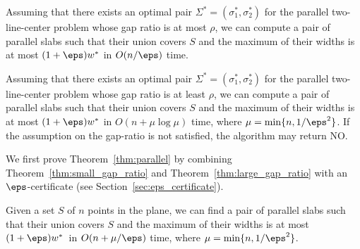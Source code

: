 \begin{theorem}
    \label{thm:small_gap_ratio}
    Assuming that there exists an optimal pair $\Sigma^* = (\sigma_1^*, \sigma_2^*)$ for the parallel two-line-center problem whose gap ratio is at most $\rho$, 
    we can compute a pair of parallel slabs such that their union covers $S$ and the maximum of their widths is at most $(1+\eps)w^*$ in $O(n/\eps)$ time. 
\end{theorem}

\begin{theorem}
    \label{thm:large_gap_ratio}
    Assuming that there exists an optimal pair $\Sigma^* = (\sigma_1^*, \sigma_2^*)$ for the parallel two-line-center problem whose gap ratio is at least $\rho$, 
    we can compute a pair of parallel slabs such that their union covers $S$ and the maximum of their widths is at most $(1+\eps)w^*$ in $O(n+ \mu\log \mu)$ time, where $\mu = \min \{n, 1/\eps^2\}$. 
    If the assumption on the gap-ratio is not satisfied, the algorithm may return NO.
\end{theorem}





We first prove  Theorem~\ref{thm:parallel} by combining Theorem~\ref{thm:small_gap_ratio} and Theorem~\ref{thm:large_gap_ratio} with an $\eps$-certificate (see Section~\ref{sec:eps_certificate}).  



\begin{theorem}
    \label{thm:parallel}
    Given a set $S$ of $n$ points in the plane, we can find a pair of parallel slabs such that their union covers $S$ and the maximum of their widths is at most $(1+\eps)w^*$~in $O(n + \mu /\eps)$ time, where $\mu = \min \{n, 1/\eps^2\}$.  
\end{theorem}



